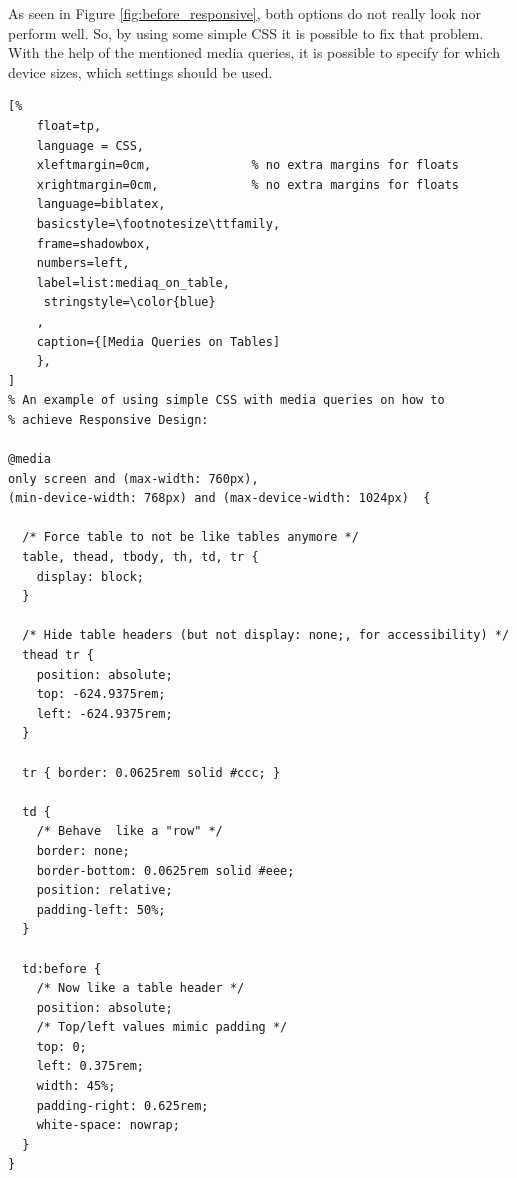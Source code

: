 As seen in Figure \ref{fig:before_responsive}, both options do not really look nor
perform well. So, by using some simple CSS it is possible to fix that
problem. With the help of the mentioned media queries, it is possible
to specify for which device sizes, which settings should be used.

\begin{lstlisting}[%
    float=tp,
    language = CSS,
    xleftmargin=0cm,              % no extra margins for floats
    xrightmargin=0cm,             % no extra margins for floats
    language=biblatex,
    basicstyle=\footnotesize\ttfamily,
    frame=shadowbox,
    numbers=left,
    label=list:mediaq_on_table,
     stringstyle=\color{blue}
    ,
    caption={[Media Queries on Tables]
    },
]
% An example of using simple CSS with media queries on how to 
% achieve Responsive Design:

@media
only screen and (max-width: 760px),
(min-device-width: 768px) and (max-device-width: 1024px)  {

  /* Force table to not be like tables anymore */
  table, thead, tbody, th, td, tr {
    display: block;
  }

  /* Hide table headers (but not display: none;, for accessibility) */
  thead tr {
    position: absolute;
    top: -624.9375rem;
    left: -624.9375rem;
  }

  tr { border: 0.0625rem solid #ccc; }

  td {
    /* Behave  like a "row" */
    border: none;
    border-bottom: 0.0625rem solid #eee;
    position: relative;
    padding-left: 50%;
  }

  td:before {
    /* Now like a table header */
    position: absolute;
    /* Top/left values mimic padding */
    top: 0;
    left: 0.375rem;
    width: 45%;
    padding-right: 0.625rem;
    white-space: nowrap;
  }
}
\end{lstlisting}

